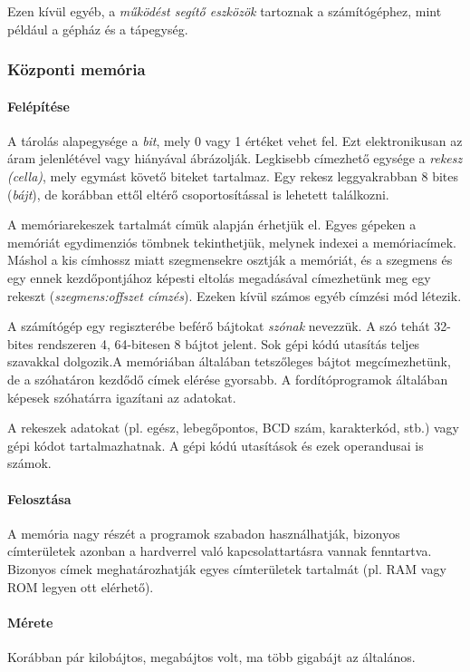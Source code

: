 \documentclass[10pt]{article}
\begin{document}
Ezen kívül egyéb, a \emph{működést segítő eszközök} tartoznak a számítógéphez, mint például a gépház és a tápegység.

\subsubsection{Központi memória}

\paragraph{Felépítése} A tárolás alapegysége a \emph{bit}, mely 0 vagy 1 értéket vehet fel. Ezt elektronikusan az áram jelenlétével vagy hiányával ábrázolják. Legkisebb címezhető egysége a \emph{rekesz (cella)}, mely egymást követő biteket tartalmaz. Egy rekesz leggyakrabban 8 bites (\emph{bájt}), de korábban ettől eltérő csoportosítással is lehetett találkozni.

A memóriarekeszek tartalmát címük alapján érhetjük el. Egyes gépeken a memóriát egydimenziós tömbnek tekinthetjük, melynek indexei a memóriacímek. Máshol a kis címhossz miatt szegmensekre osztják a memóriát, és a szegmens és egy ennek kezdőpontjához képesti eltolás megadásával címezhetünk meg egy rekeszt (\emph{szegmens:offszet címzés}). Ezeken kívül számos egyéb címzési mód létezik.

A számítógép egy regiszterébe beférő bájtokat \emph{szónak} nevezzük. A szó tehát 32-bites rendszeren 4, 64-bitesen 8 bájtot jelent. Sok gépi kódú utasítás teljes szavakkal dolgozik.A memóriában általában tetszőleges bájtot megcímezhetünk, de a szóhatáron kezdődő címek elérése gyorsabb. A fordítóprogramok általában képesek szóhatárra igazítani az adatokat.

A rekeszek adatokat (pl. egész, lebegőpontos, BCD szám, karakterkód, stb.) vagy gépi kódot tartalmazhatnak. A gépi kódú utasítások és ezek operandusai is számok.

\paragraph{Felosztása} A memória nagy részét a programok szabadon használhatják, bizonyos címterületek azonban a hardverrel való kapcsolattartásra vannak fenntartva. Bizonyos címek meghatározhatják egyes címterületek tartalmát (pl. RAM vagy ROM legyen ott elérhető).

\paragraph{Mérete} Korábban pár kilobájtos, megabájtos volt, ma több gigabájt az általános.
\end{document}
